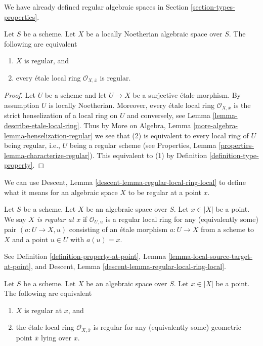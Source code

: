 \noindent
We have already defined regular algebraic spaces in
Section \ref{section-types-properties}.

\begin{lemma}
\label{lemma-regular}
Let $S$ be a scheme.
Let $X$ be a locally Noetherian algebraic space over $S$.
The following are equivalent
\begin{enumerate}
\item $X$ is regular, and
\item every \'etale local ring $\mathcal{O}_{X, \overline{x}}$ is
regular.
\end{enumerate}
\end{lemma}

\begin{proof}
Let $U$ be a scheme and let $U \to X$ be a surjective \'etale morphism.
By assumption $U$ is locally Noetherian. Moreover, every \'etale local
ring $\mathcal{O}_{X, \overline{x}}$ is the strict henselization of
a local ring on $U$ and conversely, see
Lemma \ref{lemma-describe-etale-local-ring}.
Thus by
More on Algebra, Lemma \ref{more-algebra-lemma-henselization-regular}
we see that (2) is equivalent to every local ring of $U$ being
regular, i.e., $U$ being a regular scheme (see
Properties, Lemma \ref{properties-lemma-characterize-regular}).
This equivalent to (1) by
Definition \ref{definition-type-property}.
\end{proof}

\noindent
We can use Descent, Lemma \ref{descent-lemma-regular-local-ring-local}
to define what it means for an algebraic space $X$ to be regular at a
point $x$.

\begin{definition}
\label{definition-regular-at-point}
Let $S$ be a scheme. Let $X$ be an algebraic space over $S$.
Let $x \in |X|$ be a point. We say {\it $X$ is regular at $x$}
if $\mathcal{O}_{U, u}$ is a regular local ring for any
(equivalently some) pair $(a : U \to X, u)$ consisting of an
\'etale morphism $a : U \to X$ from a scheme to $X$ and a point
$u \in U$ with $a(u) = x$.
\end{definition}

\noindent
See Definition \ref{definition-property-at-point},
Lemma \ref{lemma-local-source-target-at-point}, and
Descent, Lemma \ref{descent-lemma-regular-local-ring-local}.

\begin{lemma}
\label{lemma-regular-at-x}
Let $S$ be a scheme. Let $X$ be an algebraic space over $S$.
Let $x \in |X|$ be a point. The following are equivalent
\begin{enumerate}
\item $X$ is regular at $x$, and
\item the \'etale local ring $\mathcal{O}_{X, \overline{x}}$ is
regular for any (equivalently some) geometric point $\overline{x}$
lying over $x$.
\end{enumerate}
\end{lemma}

